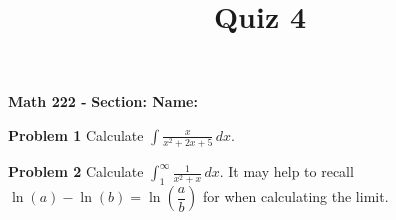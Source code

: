\documentclass{article}
\title{Quiz 4}
\begin{document}
\begin{center}\makeatletter %
{ \bf Math 222 - \@title }
{ \bf \hfill Section: \underline{\hspace{2cm}} \hfill Name: \underline{\hspace{5cm}} }
\end{center}

{\bf Problem 1} \quad Calculate $\displaystyle\int \frac{x}{x^2 + 2x + 5}\,dx$.

\vfill

{\bf Problem 2} \quad Calculate $\displaystyle\int_1^{\infty} \frac{1}{x^2 + x}\,dx$.  It may help to recall $\ln(a) - \ln(b) = \ln\left(\dfrac{a}{b}\right)$ for when calculating the limit.

\vfill
\end{document}
